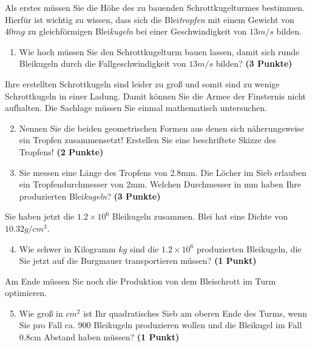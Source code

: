\documentclass[a4paper, 9pt]{scrartcl}\usepackage[]{graphicx}\usepackage[]{xcolor}
\begin{document}
Als erstes m{\"u}ssen Sie die H{\"o}he des zu bauenden Schrottkugelturmes
bestimmen. Hierf{\"u}r ist wichtig zu wissen, dass sich die
Blei\textit{tropfen} mit einem Gewicht von $40mg$ zu
gleichf{\"o}rmigen Blei\textit{kugeln} bei einer Geschwindigkeit von
$13m/s$ bilden.

\begin{enumerate}
\item Wie hoch m{\"u}ssen Sie den Schrottkugelturm bauen lassen, damit sich
  runde Bleikugeln durch die Fallgeschwindigkeit von $13m/s$ bilden?
  \textbf{(3 Punkte)}
\end{enumerate}

Ihre erstellten Schrottkugeln sind leider zu gro{\ss} und somit sind zu wenige
Schrottkugeln in einer Ladung. Damit k{\"o}nnen Sie die Armee der Finsternis
nicht aufhalten. Die Sachlage m{\"u}ssen Sie einmal mathematisch untersuchen.

\begin{enumerate}
  \setcounter{enumi}{1}
\item Nennen Sie die beiden geometrischen Formen aus denen sich
  n{\"a}herungsweise ein Tropfen zusammensetzt! Erstellen Sie eine beschriftete 
  Skizze des Tropfens!
  \textbf{(2 Punkte)}
\item Sie messen eine L{\"a}nge des Tropfens von 2.8mm. Die L{\"o}cher
  im Sieb erlauben ein Tropfendurchmesser von 2mm. Welchen
  Durchmesser in mm haben Ihre produzierten Blei\textit{kugeln}?  \textbf{(3 Punkte)}
\end{enumerate}

Sie haben jetzt die \ensuremath{1.2\times 10^{6}} Bleikugeln zusammen. Blei hat eine Dichte
von $10.32g/cm^3$.

\begin{enumerate}
  \setcounter{enumi}{3}
\item Wie schwer in Kilogramm $kg$ sind die \ensuremath{1.2\times 10^{6}} produzierten
  Bleikugeln, die Sie jetzt auf die Burgmauer transportieren m{\"u}ssen?
  \textbf{(1 Punkt)}
\end{enumerate}

Am Ende m{\"u}ssen Sie noch die Produktion von dem Bleischrott im Turm optimieren.

\begin{enumerate}
  \setcounter{enumi}{4}
\item Wie gro{\ss} in $cm^2$ ist Ihr quadratisches Sieb am oberen Ende des Turms,
  wenn Sie pro Fall ca. 900 Bleikugeln produzieren wollen und
  die Bleikugel im Fall 0.8cm Abstand haben m{\"u}ssen?  \textbf{(1
    Punkt)}
\end{enumerate}
 
\end{document}
